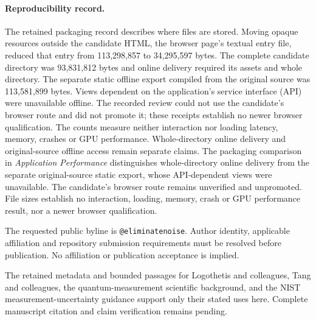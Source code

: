 \paragraph{Reproducibility record.}
The retained packaging record describes where files are stored. Moving opaque
resources outside the candidate HTML, the browser page's textual entry file,
reduced that entry from 113,298,857 to 34,295,597 bytes. The complete candidate
directory was 93,831,812 bytes and online delivery required its assets and whole
directory. The separate static offline export compiled from the original source
was 113,581,899 bytes. Views dependent on the application's service interface
(API) were unavailable offline. The recorded review could not use the
candidate's browser route and did not promote it; these receipts establish no
newer browser qualification. The counts measure neither interaction nor loading
latency, memory, crashes or GPU performance. Whole-directory online delivery and
original-source offline access remain separate claims.
\else
The packaging comparison in \textit{Application Performance} distinguishes
whole-directory online delivery from the separate original-source static export,
whose API-dependent views were unavailable. The candidate's browser route remains
unverified and unpromoted. File sizes establish no interaction, loading, memory,
crash or GPU performance result, nor a newer browser qualification.
\fi

The requested public byline is \texttt{@eliminatenoise}. Author identity,
applicable affiliation and repository submission requirements must be resolved
before publication. No affiliation or publication acceptance is implied.

The retained metadata and bounded passages for Logothetis and colleagues,
Tang and colleagues, the quantum-measurement scientific background, and the
NIST measurement-uncertainty guidance support only their stated uses here.
Complete manuscript citation and claim verification remains pending.
